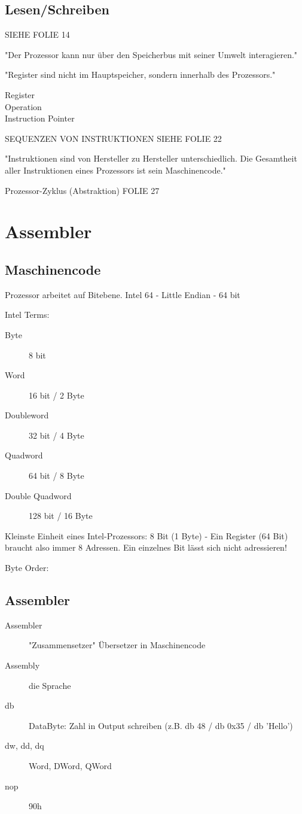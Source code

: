 \begin{multicols*}{4}
\subsection{Lesen/Schreiben}
SIEHE FOLIE 14

"Der Prozessor kann nur über den Speicherbus mit seiner Umwelt interagieren."

"Register sind nicht im Hauptspeicher, sondern innerhalb des Prozessors."

\begin{description}
    \item[Register]
    \item[Operation]
    \item[Instruction Pointer]
\end{description}

SEQUENZEN VON INSTRUKTIONEN SIEHE FOLIE 22

"Instruktionen sind von Hersteller zu Hersteller unterschiedlich. Die Gesamtheit aller Instruktionen eines Prozessors ist sein Maschinencode."

Prozessor-Zyklus (Abstraktion) FOLIE 27

    \section{Assembler}
    \subsection{Maschinencode}
    Prozessor arbeitet auf Bitebene. Intel 64 - Little Endian - 64 bit

    Intel Terms:
    \begin{description}
        \item[Byte] 8 bit
        \item[Word] 16 bit / 2 Byte
        \item[Doubleword] 32 bit / 4 Byte
        \item[Quadword] 64 bit / 8 Byte
        \item[Double Quadword] 128 bit / 16 Byte
    \end{description}

    Kleinste Einheit eines Intel-Prozessors: 8 Bit (1 Byte) - Ein Register (64 Bit) braucht also immer 8 Adressen. Ein einzelnes Bit lässt sich nicht adressieren!

    Byte Order:

    \subsection{Assembler}
    \begin{description}
        \item[Assembler] "Zusammensetzer" Übersetzer in Maschinencode
        \item[Assembly] die Sprache
        \item[db] DataByte: Zahl in Output schreiben (z.B. db 48 / db 0x35 / db 'Hello')
        \item[dw, dd, dq] Word, DWord, QWord
        \item[nop] 90h
    \end{description}


\end{multicols*}
